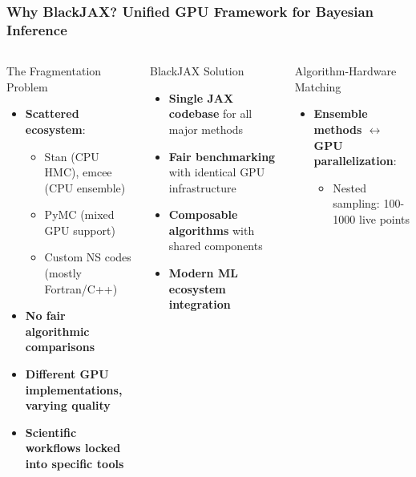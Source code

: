 \documentclass[aspectratio=169]{beamer}
\begin{document}
\begin{frame}
    \frametitle{Why BlackJAX? Unified GPU Framework for Bayesian Inference}
    \begin{columns}
        \begin{block}{The Fragmentation Problem}
            \begin{itemize}
                \item \textbf{Scattered ecosystem}:
                    \begin{itemize}
                        \item Stan (CPU HMC), emcee (CPU ensemble)
                        \item PyMC (mixed GPU support)
                        \item Custom NS codes (mostly Fortran/C++)
                    \end{itemize}
                \item \textbf{No fair algorithmic comparisons}
                \item \textbf{Different GPU implementations, varying quality}
                \item \textbf{Scientific workflows locked into specific tools}
            \end{itemize}
        \end{block}
        \begin{block}{BlackJAX Solution}
            \begin{itemize}
                \item \textbf{Single JAX codebase} for all major methods
                \item \textbf{Fair benchmarking} with identical GPU infrastructure
                \item \textbf{Composable algorithms} with shared components
                \item \textbf{Modern ML ecosystem integration}
            \end{itemize}
        \end{block}
        \begin{block}{Algorithm-Hardware Matching}
            \begin{itemize}
                \item \textbf{Ensemble methods $\leftrightarrow$ GPU parallelization}:
                    \begin{itemize}
                        \item Nested sampling: 100-1000 live points

\end{itemize}
\end{itemize}
\end{block}
\end{columns}
\end{frame}
\end{document}

